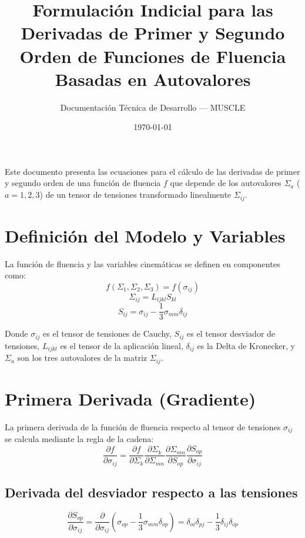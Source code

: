 \documentclass[12pt]{article}
\begin{document}
\title{\textbf{Formulación Indicial para las Derivadas de Primer y Segundo Orden de Funciones de Fluencia Basadas en Autovalores}}
\author{Documentación Técnica de Desarrollo --- MUSCLE}
\date{\today}
\maketitle

Este documento presenta las ecuaciones para el cálculo de las derivadas de primer y segundo orden de una función de fluencia $f$ que depende de los autovalores $\Sigma_a$ ($a=1,2,3$) de un tensor de tensiones transformado linealmente $\Sigma_{ij}$.

\section{Definición del Modelo y Variables}

La función de fluencia y las variables cinemáticas se definen en componentes como:
\[ f(\Sigma_1, \Sigma_2, \Sigma_3) = f(\sigma_{ij}) \]
\[ \Sigma_{ij} = L_{ijkl} S_{kl} \]
\[ S_{ij} = \sigma_{ij} - \frac{1}{3}\sigma_{mm} \delta_{ij} \]

Donde $\sigma_{ij}$ es el tensor de tensiones de Cauchy, $S_{ij}$ es el tensor desviador de tensiones, $L_{ijkl}$ es el tensor de la aplicación lineal, $\delta_{ij}$ es la Delta de Kronecker, y $\Sigma_a$ son los tres autovalores de la matriz $\Sigma_{ij}$.

\section{Primera Derivada (Gradiente)}

La primera derivada de la función de fluencia respecto al tensor de tensiones $\sigma_{ij}$ se calcula mediante la regla de la cadena:
\begin{equation}
    \frac{\partial f}{\partial \sigma_{ij}} = \frac{\partial f}{\partial \Sigma_k} \frac{\partial \Sigma_k}{\partial \Sigma_{mn}} \frac{\partial \Sigma_{mn}}{\partial S_{op}} \frac{\partial S_{op}}{\partial \sigma_{ij}}
\end{equation}

\subsection{Derivada del desviador respecto a las tensiones}
\begin{equation}
    \frac{\partial S_{op}}{\partial \sigma_{ij}} = \frac{\partial}{\partial \sigma_{ij}}\left(\sigma_{op} - \frac{1}{3}\sigma_{mm} \delta_{op}\right) = \delta_{oi}\delta_{pj} - \frac{1}{3}\delta_{ij}\delta_{op}
\end{equation}
\end{document}
